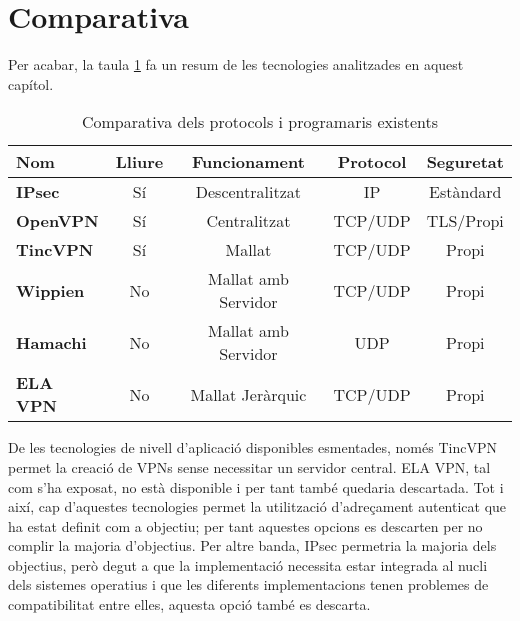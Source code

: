 \section{Comparativa}
Per acabar, la taula \ref{T:statecomp} fa un resum de les tecnologies analitzades en aquest capítol.
\begin{table}[htb]
\begin{center}
\begin{tabular}{|l|c|c|c|c|}
\hline
Nom & Lliure & Funcionament & Protocol & Seguretat \\ \hline \hline
\bf IPsec & Sí & Descentralitzat & IP & Estàndard \\ \hline
\bf OpenVPN & Sí & Centralitzat & TCP/UDP & TLS/Propi \\ \hline
\bf TincVPN & Sí & Mallat & TCP/UDP & Propi \\ \hline
\bf Wippien & No & Mallat amb Servidor & TCP/UDP & Propi \\ \hline
\bf Hamachi & No & Mallat amb Servidor & UDP & Propi \\ \hline
\bf ELA VPN & No & Mallat Jeràrquic & TCP/UDP & Propi \\ \hline
\end{tabular}
\end{center}
\begin{center}
\caption{Comparativa dels protocols i programaris existents}
\label{T:statecomp}
\end{center}
\end{table}

De les tecnologies de nivell d'aplicació disponibles esmentades, només TincVPN permet la creació de VPNs sense necessitar un servidor central. ELA VPN, tal com s'ha exposat, no està disponible i per tant també quedaria descartada. Tot i així, cap d'aquestes tecnologies permet la utilització d'adreçament autenticat que ha estat definit com a objectiu; per tant aquestes opcions es descarten per no complir la majoria d'objectius.
Per altre banda, IPsec permetria la majoria dels objectius, però degut a que la implementació necessita estar integrada al nucli dels sistemes operatius i que les diferents implementacions tenen problemes de compatibilitat entre elles, aquesta opció també es descarta.
